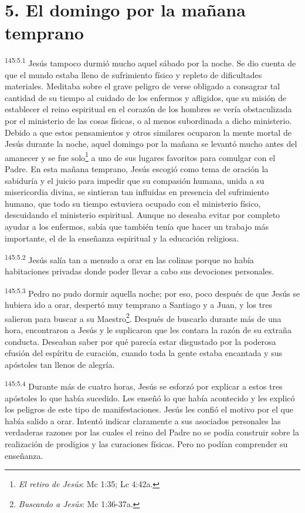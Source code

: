\section*{5. El domingo por la mañana temprano}
\par
\textsuperscript{145:5.1} Jesús tampoco durmió mucho aquel sábado por la noche. Se dio cuenta de que el mundo estaba lleno de sufrimiento físico y repleto de dificultades materiales. Meditaba sobre el grave peligro de verse obligado a consagrar tal cantidad de su tiempo al cuidado de los enfermos y afligidos, que su misión de establecer el reino espiritual en el corazón de los hombres se vería obstaculizada por el ministerio de las cosas físicas, o al menos subordinada a dicho ministerio. Debido a que estos pensamientos y otros similares ocuparon la mente mortal de Jesús durante la noche, aquel domingo por la mañana se levantó mucho antes del amanecer y se fue solo\footnote{\textit{El retiro de Jesús}: Mc 1:35; Lc 4:42a.} a uno de sus lugares favoritos para comulgar con el Padre. En esta mañana temprano, Jesús escogió como tema de oración la sabiduría y el juicio para impedir que su compasión humana, unida a su misericordia divina, se sintieran tan influidas en presencia del sufrimiento humano, que todo su tiempo estuviera ocupado con el ministerio físico, descuidando el ministerio espiritual. Aunque no deseaba evitar por completo ayudar a los enfermos, sabía que también tenía que hacer un trabajo más importante, el de la enseñanza espiritual y la educación religiosa.

\par
\textsuperscript{145:5.2} Jesús salía tan a menudo a orar en las colinas porque no había habitaciones privadas donde poder llevar a cabo sus devociones personales.

\par
\textsuperscript{145:5.3} Pedro no pudo dormir aquella noche; por eso, poco después de que Jesús se hubiera ido a orar, despertó muy temprano a Santiago y a Juan, y los tres salieron para buscar a su Maestro\footnote{\textit{Buscando a Jesús}: Mc 1:36-37a.}. Después de buscarlo durante más de una hora, encontraron a Jesús y le suplicaron que les contara la razón de su extraña conducta. Deseaban saber por qué parecía estar disgustado por la poderosa efusión del espíritu de curación, cuando toda la gente estaba encantada y sus apóstoles tan llenos de alegría.

\par
\textsuperscript{145:5.4} Durante más de cuatro horas, Jesús se esforzó por explicar a estos tres apóstoles lo que había sucedido. Les enseñó lo que había acontecido y les explicó los peligros de este tipo de manifestaciones. Jesús les confió el motivo por el que había salido a orar. Intentó indicar claramente a sus asociados personales las verdaderas razones por las cuales el reino del Padre no se podía construir sobre la realización de prodigios y las curaciones físicas. Pero no podían comprender su enseñanza.

